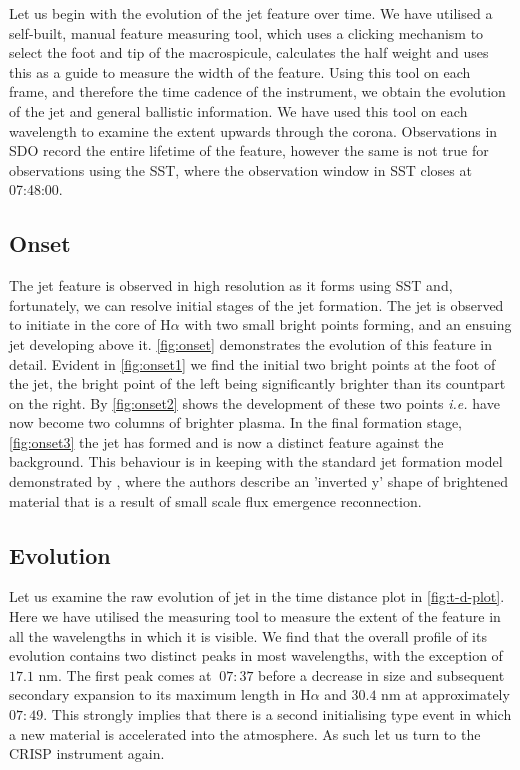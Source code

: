 \documentclass{emulateapj}
\begin{document}
Let us begin with the evolution of the jet feature over time. 
We have utilised a self-built, manual feature measuring tool, which uses a clicking mechanism to select the foot and tip of the macrospicule, calculates the half weight and uses this as a guide to measure the width of the feature.
Using this tool on each frame, and therefore the time cadence of the instrument, we obtain the evolution of the jet and general ballistic information.
We have used this tool on each wavelength to examine the extent upwards through the corona. 
Observations in SDO record the entire lifetime of the feature, however the same is not true for observations using the SST, where the observation window in SST closes at 07:48:00.

\subsection{Onset}
The jet feature is observed in high resolution as it forms using SST and, fortunately, we can resolve initial stages of the jet formation.
The jet is observed to initiate in the core of H$\alpha$ with two small bright points forming, and an ensuing jet developing above it. 
\cref{fig:onset} demonstrates the evolution of this feature in detail.
Evident in \cref{fig:onset1} we find the initial two bright points at the foot of the jet, the bright point of the left being significantly brighter than its countpart on the right.
By \cref{fig:onset2} shows the development of these two points \emph{i.e.} have now become two columns of brighter plasma.
In the final formation stage, \cref{fig:onset3} the jet has formed and is now a distinct feature against the background.
This behaviour is in keeping with the standard jet formation model demonstrated by \cite{Shibata1992}, where the authors describe an 'inverted y' shape of brightened material that is a result of small scale flux emergence reconnection.



\subsection{Evolution}
Let us examine the raw evolution of jet in the time distance plot in \cref{fig:t-d-plot}.
Here we have utilised the measuring tool to measure the extent of the feature in all the wavelengths in which it is visible.
We find that the overall profile of its evolution contains two distinct peaks in most wavelengths, with the exception of $17.1$ nm.
The first peak comes at $~07:37$ before a decrease in size and subsequent secondary expansion to its maximum length in H$\alpha$ and $30.4$ nm at approximately $07:49$.
This strongly implies that there is a second initialising type event in which a new material is accelerated into the atmosphere.
As such let us turn to the CRISP instrument again.
\end{document}
